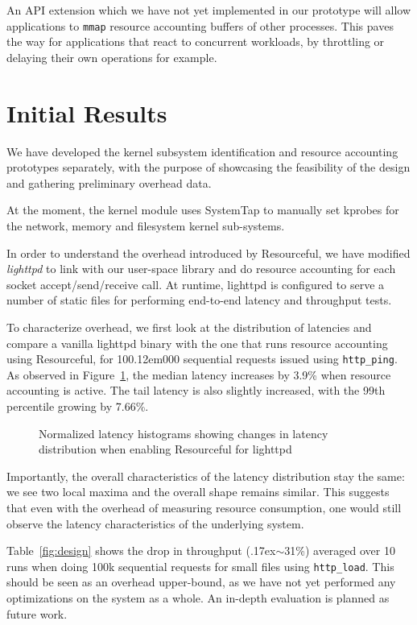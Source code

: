 \documentclass[letterpaper,twocolumn,10pt]{article}
\newcommand{\pname}{Resourceful}
\begin{document}
An API extension which we have not yet implemented in our prototype will allow applications
to \texttt{mmap} resource accounting buffers of other processes. This paves the way for applications that
react to concurrent workloads, by throttling or delaying their own
operations for example.

\section{Initial Results}
We have developed the kernel subsystem identification and resource accounting
prototypes separately, with the purpose of showcasing the feasibility of the design
and gathering preliminary overhead data.

At the moment, the kernel module uses SystemTap to manually set kprobes for the
network, memory and filesystem kernel sub-systems.

In order to understand the overhead introduced by \pname, we have modified
\textit{lighttpd} to link with our user-space library and do resource accounting
for each socket accept/send/receive call. At runtime, lighttpd is configured to serve
a number of static files for performing end-to-end latency and throughput tests.

To characterize overhead, we first look at the distribution of latencies and
compare a vanilla lighttpd binary with the one that runs resource accounting
using \pname, for 10{\kern 0.12em}000 sequential requests issued using \texttt{http\_ping}. As
observed in Figure~\ref{fig:experiment1}, the median latency increases by 3.9\%
when resource accounting is active. The tail latency is also slightly increased,
with the 99th percentile growing by 7.66\%.
\begin{figure}[ht!] 
	\centering
	\hspace*{-0.05\columnwidth} 
	\def\svgwidth{\columnwidth}
	
	\caption{Normalized latency histograms showing changes in latency distribution when enabling \pname{ }for lighttpd} 
	\label{fig:experiment1}
\end{figure}

Importantly, the overall characteristics of the latency distribution stay the
same: we see two local maxima and the overall shape remains similar. This
suggests that even with the overhead of measuring resource consumption, one
would still observe the latency characteristics of the underlying system. 

Table~\ref{fig:design} shows the drop in throughput ({\raise.17ex\hbox{$\scriptstyle\sim$}}31\%) averaged over 10
runs when doing 100k sequential requests for small files using \texttt{http\_load}. This should
be seen as an overhead upper-bound, as we have not yet performed any
optimizations on the system as a whole. An in-depth evaluation is planned as
future work.
\end{document}
